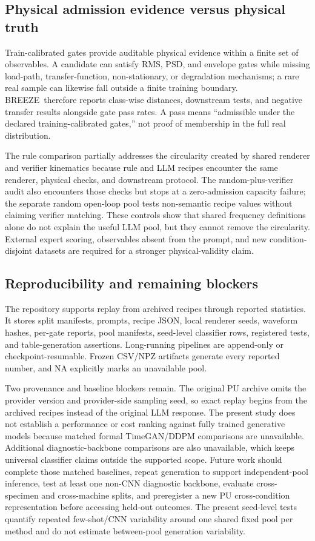 \documentclass[a4paper,fleqn]{cas-sc}
\newcommand{\breeze}{BREEZE}
\begin{document}
\subsection{Physical admission evidence versus physical truth}

Train-calibrated gates provide auditable physical evidence within a finite set
of observables. A candidate can satisfy RMS, PSD, and envelope gates while
missing load-path, transfer-function, non-stationary, or degradation
mechanisms; a rare real sample can likewise fall outside a finite training
boundary. \breeze\ therefore reports class-wise distances, downstream tests,
and negative transfer results alongside gate pass rates. A pass means
``admissible under the declared training-calibrated gates,'' not proof of
membership in the full real distribution.

The rule comparison partially addresses the circularity created by shared
renderer and verifier kinematics because rule and LLM recipes encounter the
same renderer, physical checks, and downstream protocol. The
random-plus-verifier audit also encounters those checks but stops at a
zero-admission capacity failure; the separate random open-loop pool tests
non-semantic recipe values without claiming verifier matching. These controls
show that shared frequency definitions alone do not explain the useful LLM
pool, but they cannot remove the circularity. External expert scoring,
observables absent from the prompt, and new condition-disjoint datasets are
required for a stronger physical-validity claim.

\subsection{Reproducibility and remaining blockers}

The repository supports replay from archived recipes through reported
statistics. It stores split manifests, prompts, recipe JSON, local renderer
seeds, waveform hashes, per-gate reports, pool manifests, seed-level classifier
rows, registered tests, and table-generation assertions. Long-running
pipelines are append-only or checkpoint-resumable. Frozen CSV/NPZ artifacts
generate every reported number, and NA explicitly marks an unavailable pool.

Two provenance and baseline blockers remain. The original PU archive omits the
provider version and provider-side sampling seed, so exact replay begins from
the archived recipes instead of the original LLM response. The present study
does not establish a performance or cost ranking against fully trained
generative models because matched formal TimeGAN/DDPM comparisons are
unavailable. Additional diagnostic-backbone comparisons are also unavailable,
which keeps universal classifier claims outside the supported scope. Future
work should complete those matched baselines, repeat generation to support
independent-pool inference, test at least one non-CNN diagnostic backbone,
evaluate cross-specimen and cross-machine splits, and preregister a new PU
cross-condition representation before accessing held-out outcomes. The present
seed-level tests quantify repeated few-shot/CNN variability around one shared
fixed pool per method and do not estimate between-pool generation variability.
\end{document}
